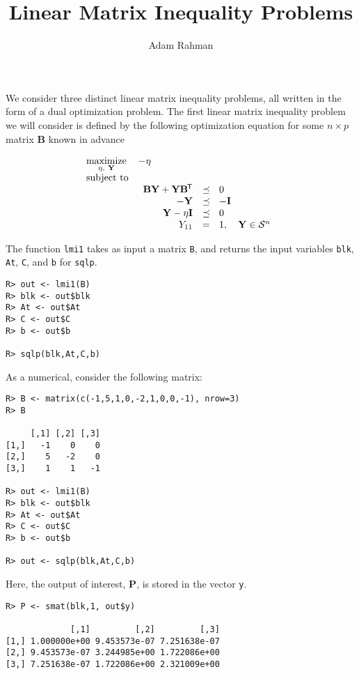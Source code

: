 \documentclass{article}
\author{Adam Rahman}
\title{Linear Matrix Inequality Problems}
\newcommand{\m}[1]{\mathbf{#1}}               %
\newcommand{\tr}[1]{{#1}^{\mkern-1.5mu\mathsf{T}}}              %
\begin{document}
\maketitle

We consider three distinct linear matrix inequality problems, all written in the form of a dual optimization problem. The first linear matrix inequality problem we will consider is defined by the following optimization equation for some $n\times p$ matrix $\m{B}$ known in advance

\[
\begin{array}{ll}
\underset{\eta,~\m{Y}}{\text{maximize}} & -\eta \\
\text{subject to} & \\
 & \begin{array}{rl}
\m{B}\m{Y} + \m{Y}\tr{\m{B}} &\preceq~~ 0 \\
-\m{Y} &\preceq~~ -\m{I} \\
\m{Y} - \eta \m{I} &\preceq~~ 0 \\
Y_{11} &=~~ 1, \quad \m{Y} \in \mathcal{S}^{n}
\end{array}
\end{array}
\]

The function \verb!lmi1! takes as input a matrix \verb!B!, and returns the input variables \verb!blk!, \verb!At!, \verb!C!, and \verb!b! for \verb!sqlp!.

\begin{verbatim}
R> out <- lmi1(B)
R> blk <- out$blk
R> At <- out$At
R> C <- out$C
R> b <- out$b

R> sqlp(blk,At,C,b)
\end{verbatim}

As a numerical, consider the following matrix:

\begin{verbatim}
R> B <- matrix(c(-1,5,1,0,-2,1,0,0,-1), nrow=3)
R> B

     [,1] [,2] [,3]
[1,]   -1    0    0
[2,]    5   -2    0
[3,]    1    1   -1

R> out <- lmi1(B)
R> blk <- out$blk
R> At <- out$At
R> C <- out$C
R> b <- out$b

R> out <- sqlp(blk,At,C,b)
\end{verbatim}

Here, the output of interest, $\m{P}$, is stored in the vector \verb!y!.

\begin{verbatim}
R> P <- smat(blk,1, out$y)

             [,1]         [,2]         [,3]
[1,] 1.000000e+00 9.453573e-07 7.251638e-07
[2,] 9.453573e-07 3.244985e+00 1.722086e+00
[3,] 7.251638e-07 1.722086e+00 2.321009e+00
\end{verbatim}
\end{document}
